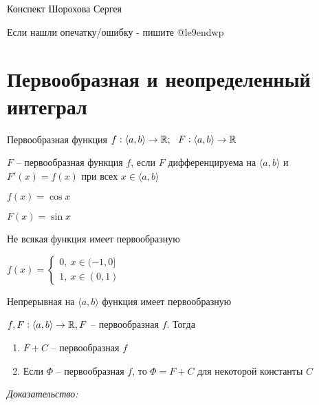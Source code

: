 \documentclass[12pt]{article}
\newcommand{\q}[1]{\langle #1 \rangle}
\begin{document}
\begin{flushright}
    Конспект Шорохова Сергея

    Если нашли опечатку/ошибку - пишите @le9endwp
\end{flushright}

\section*{Первообразная и неопределенный интеграл}

\begin{defin}{Первообразная функция}
    $f : \q{a, b} \rightarrow \R;\ \ F: \q{a, b} \rightarrow \R$ 

    $F$ -- первообразная функция $f$, если $F$ дифференцируема на $\q{a, b}$ и $F'(x) = f(x)$ при всех $x \in \q{a, b}$

    \begin{Example}{}
        $f(x) = \cos{x}$

        $F(x) = \sin{x}$ 
    \end{Example}
\end{defin}

\begin{propos}{}
    Не всякая функция имеет первообразную

    \begin{Example}{}
        $f(x) = \begin{cases}
            0,\ x \in (-1, 0] \\
            1,\ x \in (0, 1)
        \end{cases}$
    \end{Example}
\end{propos}

\begin{propos}{}
    Непрерывная на $\q{a, b}$ функция имеет первообразную
\end{propos}

\begin{theo}{}
    $f, F : \q{a, b} \rightarrow \R, F$ -- первообразная $f$. Тогда

    \begin{enumerate}
        \item $F + C$ -- первообразная $f$
        \item Если $\Phi$ -- первообразная $f$, то $\Phi = F + C$ для некоторой константы $C$
    \end{enumerate}
\end{theo}

\textit{Доказательство:}
\end{document}
